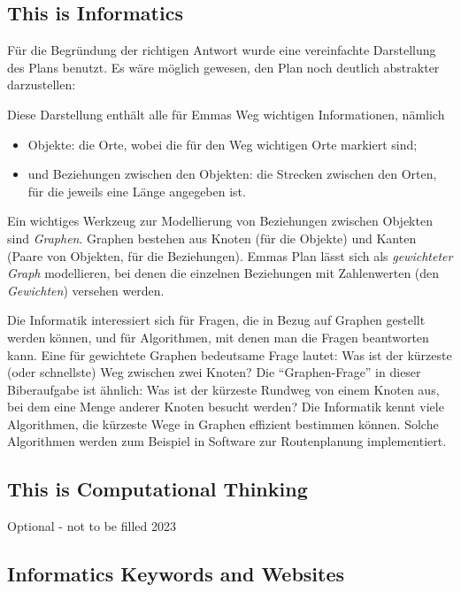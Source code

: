 \documentclass[a4paper,11pt]{report}
\newcommand{\taskGraphicsFolder}{..}
\begin{document}
\subsection*{This is Informatics}

Für die Begründung der richtigen Antwort wurde eine vereinfachte Darstellung des Plans benutzt.
Es wäre möglich gewesen, den Plan noch deutlich abstrakter darzustellen:

{\centering%
\par}

Diese Darstellung enthält alle für Emmas Weg wichtigen Informationen, nämlich

\begin{itemize}
  \item Objekte: die Orte, wobei die für den Weg wichtigen Orte markiert sind;
  \item und Beziehungen zwischen den Objekten: die Strecken zwischen den Orten, für die jeweils eine Länge angegeben ist.
\end{itemize}

Ein wichtiges Werkzeug zur Modellierung von Beziehungen zwischen Objekten sind \emph{Graphen}.
Graphen bestehen aus Knoten (für die Objekte) und Kanten (Paare von Objekten, für die Beziehungen).
Emmas Plan lässt sich als \emph{gewichteter Graph} modellieren,
bei denen die einzelnen Beziehungen mit Zahlenwerten (den \emph{Gewichten}) versehen werden.

Die Informatik interessiert sich für Fragen, die in Bezug auf Graphen gestellt werden können,
und für Algorithmen, mit denen man die Fragen beantworten kann.
Eine für gewichtete Graphen bedeutsame Frage lautet:
Was ist der kürzeste (oder schnellste) Weg zwischen zwei Knoten?
Die \enquote{Graphen-Frage} in dieser Biberaufgabe ist ähnlich:
Was ist der kürzeste Rundweg von einem Knoten aus, bei dem eine Menge anderer Knoten besucht werden?
Die Informatik kennt viele Algorithmen, die kürzeste Wege in Graphen effizient bestimmen können.
Solche Algorithmen werden zum Beispiel in Software zur Routenplanung implementiert.


\subsection*{This is Computational Thinking}

Optional - not to be filled 2023


\subsection*{Informatics Keywords and Websites}
\end{document}
